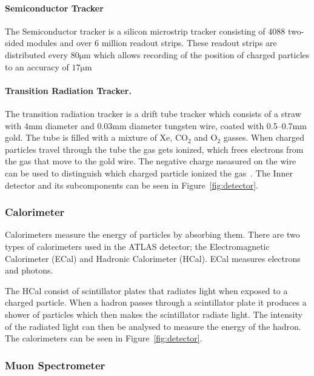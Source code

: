 \documentclass[12pt,a4paper]{article}
\numberwithin{equation}{section}
\begin{document}
\paragraph{Semiconductor Tracker}
The Semiconductor tracker is a silicon microstrip tracker consisting of 4088
two-sided modules and over 6 million readout strips. These readout strips are
distributed every $80\mathrm{\mu m}$ which allows recording of the position of
charged particles to an accuracy of $17\mathrm{\mu m}$

\paragraph{Transition Radiation Tracker.}
The transition radiation tracker is a drift tube tracker which consists of a
straw with 4mm diameter and 0.03mm diameter tungsten wire, coated with 0.5--0.7mm
gold. The tube is filled with a mixture of Xe, $\mathrm{CO_2}$ and
$\mathrm{O_2}$ gasses. When charged particles travel through the tube the gas
gets ionized, which frees electrons from the gas that move to the gold wire. The
negative charge measured on the wire can be used to distinguish which charged
particle ionized the gas~\cite{ATLAS-ID}. The Inner detector and its
subcomponents can be seen in Figure~\ref{fig:detector}.


\subsubsection{Calorimeter}
Calorimeters measure the energy of particles by absorbing them. There are two
types of calorimeters used in the ATLAS detector; the Electromagnetic
Calorimeter (ECal) and Hadronic Calorimeter (HCal). ECal measures electrons and photons.


The HCal consist of scintillator plates that radiates light when exposed to a
charged particle. When a hadron passes through a scintillator plate it produces
a shower of particles which then makes the scintillator radiate light. The
intensity of the radiated light can then be analysed to measure the energy of
the hadron. The calorimeters can be seen in Figure~\ref{fig:detector}.\cite{detector-vid}


\subsubsection{Muon Spectrometer}
\end{document}
